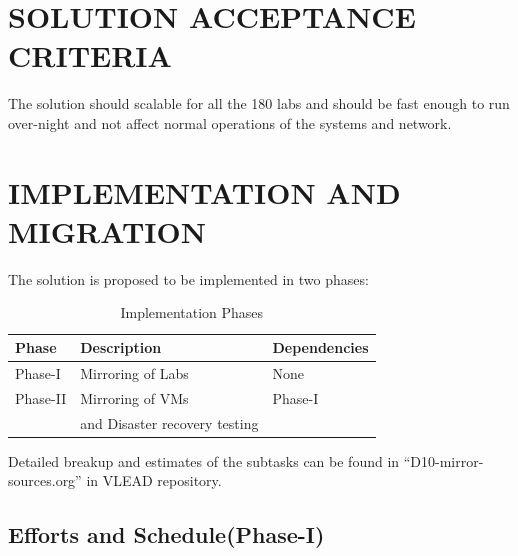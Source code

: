\documentclass[11pt]{article}
\begin{document}
\section{SOLUTION ACCEPTANCE CRITERIA}
\label{sec-10}

 The solution should scalable for all the 180 labs and should be
   fast enough to run over-night and not affect normal operations of
   the systems and network.
\section{IMPLEMENTATION AND MIGRATION}
\label{sec-11}

 The solution is proposed to be implemented in two phases:


\begin{table}[H]
\caption{\label{tbl: Implementation Phases}Implementation Phases}
\begin{center}
\begin{tabular}{lll}
\hline
 Phase     &  Description                    &  Dependencies  \\
\hline
 Phase-I   &  Mirroring of Labs              &  None          \\
 Phase-II  &  Mirroring of VMs               &  Phase-I       \\
           &  and Disaster recovery testing  &                \\
\hline
\end{tabular}
\end{center}
\end{table}

 
 Detailed breakup and estimates of the subtasks can be found in
   ``D10-mirror-sources.org'' in VLEAD repository.
\subsection{Efforts and Schedule(Phase-I)}
\label{sec-11.1}
\end{document}
